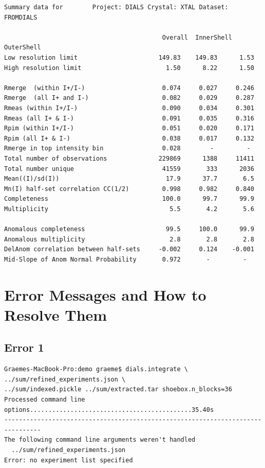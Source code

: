 \documentclass[a4paper, 11pt]{article}
\begin{document}
{\small
\begin{verbatim}
Summary data for        Project: DIALS Crystal: XTAL Dataset: FROMDIALS

                                           Overall  InnerShell  OuterShell
Low resolution limit                      149.83    149.83      1.53
High resolution limit                       1.50      8.22      1.50

Rmerge  (within I+/I-)                     0.074     0.027     0.246
Rmerge  (all I+ and I-)                    0.082     0.029     0.287
Rmeas (within I+/I-)                       0.090     0.034     0.301
Rmeas (all I+ & I-)                        0.091     0.035     0.316
Rpim (within I+/I-)                        0.051     0.020     0.171
Rpim (all I+ & I-)                         0.038     0.017     0.132
Rmerge in top intensity bin                0.028        -         - 
Total number of observations              229869      1388     11411
Total number unique                        41559       333      2036
Mean((I)/sd(I))                             17.9      37.7       6.5
Mn(I) half-set correlation CC(1/2)         0.998     0.982     0.840
Completeness                               100.0      99.7      99.9
Multiplicity                                 5.5       4.2       5.6

Anomalous completeness                      99.5     100.0      99.9
Anomalous multiplicity                       2.8       2.8       2.8
DelAnom correlation between half-sets     -0.002     0.124    -0.001
Mid-Slope of Anom Normal Probability       0.972       -         -  
\end{verbatim}
}

\section{Error Messages and How to Resolve Them}

\subsection{Error 1}

{\small
\begin{verbatim}
Graemes-MacBook-Pro:demo graeme$ dials.integrate \
../sum/refined_experiments.json \
../sum/indexed.pickle ../sum/extracted.tar shoebox.n_blocks=36
Processed command line options............................................35.40s
--------------------------------------------------------------------------------
The following command line arguments weren't handled
  ../sum/refined_experiments.json
Error: no experiment list specified
\end{verbatim}
}
\end{document}
